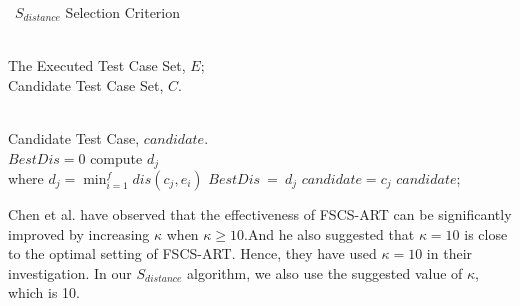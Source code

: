\documentclass{sig-alternate}
\begin{document}
\renewcommand{\algorithmicrequire}{ \textbf{Input:}} %
\renewcommand{\algorithmicensure}{ \textbf{Output:}} %
\begin{algorithm}[htb] 
\caption{ ~$S_{distance}$ Selection Criterion  } 
\label{alg:Framwork} 
\begin{algorithmic}[1] %
\REQUIRE ~~\\ %
The Executed Test Case Set, $E$;\\
Candidate Test Case Set, $C$.

\ENSURE ~~\\ %
Candidate Test Case, $candidate$.\bigskip\\
\label{ code:fram:gen }
\STATE $BestDis = 0$
\STATE compute $d_{j}$\\where $ d_{j} = \min_{i=1}^{f} dis(c_{j}, e_{i})$
\STATE $BestDis~=~d_{j}$
\STATE $candidate = c_{j}$
\ENDIF
\ENDFOR
\RETURN $candidate$; %
\end{algorithmic}
\end{algorithm}

Chen et al.\cite{39239038} have observed that the effectiveness of FSCS-ART can be significantly improved by increasing $\kappa$ when $\kappa\geq10$.And he also suggested that $\kappa = 10$ is close to the optimal setting of
FSCS-ART. Hence, they have used $\kappa = 10$ in their investigation.\cite{chen2009adaptive} In our $S_{distance}$ algorithm, we also use the suggested value of $\kappa$, which is 10.
\end{document}
